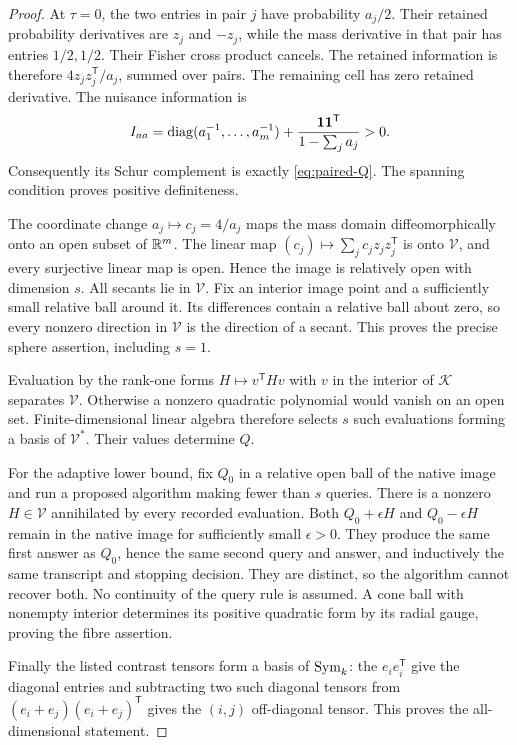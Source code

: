 \begin{proof}
At $\tau=0$, the two entries in pair $j$ have probability $a_j/2$. Their retained probability derivatives are $z_j$ and $-z_j$, while the mass derivative in that pair has entries $1/2,1/2$. Their Fisher cross product cancels. The retained information is therefore $4z_jz_j^{\mathsf T}/a_j$, summed over pairs. The remaining cell has zero retained derivative. The nuisance information is
\[
 I_{aa}=\operatorname{diag}(a_1^{-1},\ldots,a_m^{-1})+
 \frac{\mathbf1\mathbf1^{\mathsf T}}{1-\sum_j a_j}>0.
\]
Consequently its Schur complement is exactly \eqref{eq:paired-Q}. The spanning condition proves positive definiteness.

The coordinate change $a_j\mapsto c_j=4/a_j$ maps the mass domain diffeomorphically onto an open subset of $\mathbb R^m$. The linear map $(c_j)\mapsto\sum_jc_jz_jz_j^{\mathsf T}$ is onto $\mathcal V$, and every surjective linear map is open. Hence the image is relatively open with dimension $s$. All secants lie in $\mathcal V$. Fix an interior image point and a sufficiently small relative ball around it. Its differences contain a relative ball about zero, so every nonzero direction in $\mathcal V$ is the direction of a secant. This proves the precise sphere assertion, including $s=1$.

Evaluation by the rank-one forms $H\mapsto v^{\mathsf T}Hv$ with $v$ in the interior of $\mathcal K$ separates $\mathcal V$. Otherwise a nonzero quadratic polynomial would vanish on an open set. Finite-dimensional linear algebra therefore selects $s$ such evaluations forming a basis of $\mathcal V^*$. Their values determine $Q$.

For the adaptive lower bound, fix $Q_0$ in a relative open ball of the native image and run a proposed algorithm making fewer than $s$ queries. There is a nonzero $H\in\mathcal V$ annihilated by every recorded evaluation. Both $Q_0+\epsilon H$ and $Q_0-\epsilon H$ remain in the native image for sufficiently small $\epsilon>0$. They produce the same first answer as $Q_0$, hence the same second query and answer, and inductively the same transcript and stopping decision. They are distinct, so the algorithm cannot recover both. No continuity of the query rule is assumed. A cone ball with nonempty interior determines its positive quadratic form by its radial gauge, proving the fibre assertion.

Finally the listed contrast tensors form a basis of $\operatorname{Sym}_k$: the $e_ie_i^{\mathsf T}$ give the diagonal entries and subtracting two such diagonal tensors from $(e_i+e_j)(e_i+e_j)^{\mathsf T}$ gives the $(i,j)$ off-diagonal tensor. This proves the all-dimensional statement.
\end{proof}


